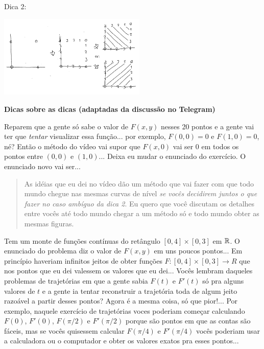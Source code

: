 \documentclass[oneside,12pt]{article}
\begin{document}
Dica 2:

\includegraphics[width=7cm]{2020-2-C3/20210317_curvas_de_nivel_3.pdf}

\newpage


{\bf Dicas sobre as dicas (adaptadas da discussão no Telegram)}

Reparem que a gente só sabe o valor de $F(x,y)$ nesses 20 pontos e a
gente vai ter que {\sl tentar} visualizar essa função... por exemplo,
$F(0,0)=0$ e $F(1,0)=0$, né? Então o método do vídeo vai supor que
$F(x,0)$ vai ser 0 em todos os pontos entre $(0,0)$ e $(1,0)$... Deixa
eu mudar o enunciado do exercício. O enunciado novo vai ser...



\begin{quote}

  As idéias que eu dei no vídeo dão um método que vai fazer com que
  todo mundo chegue nas mesmas curvas de nível {\sl se vocês decidirem
    juntos o que fazer no caso ambíguo da dica 2}. Eu quero que você
  discutam os detalhes entre vocês até todo mundo chegar a um método
  só e todo mundo obter as mesmas figuras.

\end{quote}

Tem um monte de funções contínuas do retângulo $[0,4]×[0,3]$ em $\mathbb{R}$.
O enunciado do problema diz o valor de $F(x,y)$ em uns poucos
pontos... Em princípio haveriam infinitos jeitos de obter funções $F:
[0,4]×[0,3] → R$ que nos pontos que eu dei valessem os valores que eu
dei... Vocês lembram daqueles problemas de trajetórias em que a gente
sabia $F(t)$ e $F'(t)$ só pra alguns valores de $t$ e a gente ia
tentar reconstruir a trajetória toda de algum jeito razoável a partir
desses pontos? Agora é a mesma coisa, só que pior!... Por exemplo,
naquele exercício de trajetórias voces poderiam começar calculando
$F(0)$, $F'(0)$, $F(\pi/2)$ e $F'(\pi/2)$ porque são pontos em que as
contas são fáceis, mas se vocês quisessem calcular $F(\pi/4)$ e
$F'(\pi/4)$ vocês poderiam usar a calculadora ou o computador e obter
os valores exatos pra esses pontos...
\end{document}
